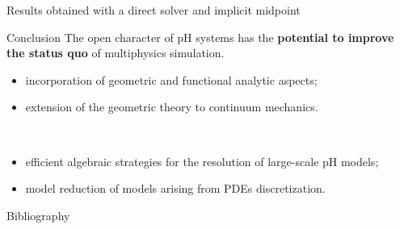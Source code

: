 \documentclass[aspectratio=169]{beamer}
\begin{document}
\begin{frame}{Results obtained with a direct solver and implicit midpoint}
	
	
\end{frame}

\begin{frame}{Conclusion}
	The open character of pH systems has the \textbf{potential to improve the status quo} of multiphysics simulation.  \\
	\vspace{.3cm}
	\begin{tcolorbox}[nobeforeafter, colframe=theme,title=Analytical developments]%
	\begin{itemize}
		\item incorporation of geometric and functional analytic aspects;
		\item extension of the geometric theory to continuum mechanics.
	\end{itemize}
	\end{tcolorbox} 
	\vspace{.3cm}\\
	\begin{tcolorbox}[nobeforeafter, colframe=theme,title=Application oriented developments]%
	\begin{itemize}
		\item efficient algebraic strategies for the resolution of large-scale pH models;
		\item model reduction of models arising from PDEs discretization.
	\end{itemize}
	\end{tcolorbox}

\end{frame}
	
\begin{frame}{Bibliography}
	\printbibliography
\end{frame}

	\appendix
	
	
	
	
\end{document}
